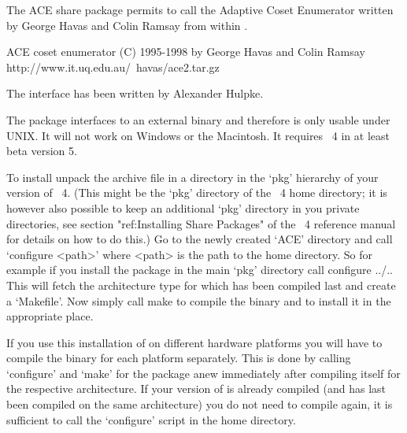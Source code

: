 

The ACE share package permits to call the Adaptive Coset Enumerator written
by George Havas and Colin Ramsay from within {\GAP}. 

\begintt
ACE coset enumerator (C) 1995-1998 by George Havas and Colin Ramsay
    http://www.it.uq.edu.au/~havas/ace2.tar.gz
\endtt

The {\GAP} interface has been written by Alexander Hulpke.

The package interfaces to an external binary and therefore is only usable
under UNIX. It will not work on Windows or the Macintosh. It requires
{\GAP}~4 in at least beta version 5.


To install unpack the archive file in a directory in the `pkg' hierarchy of
your version of {\GAP}~4. (This might be the `pkg' directory of the
{\GAP}~4 home directory; it is however also possible to keep an additional
`pkg' directory in you private directories, see section "ref:Installing
Share Packages" of the {\GAP}~4 reference manual for details on how to do
this.) Go to the newly created `ACE' directory and call `configure <path>'
where <path> is the path to the {\GAP} home directory. So for example if you
install the package in the main `pkg' directory call
\begintt
configure ../..
\endtt
This will fetch the architecture type for which {\GAP} has been compiled last
and create a `Makefile'. 
Now simply call
\begintt
make
\endtt
to compile the binary and to install it in the appropriate place.

If you use this installation of {\GAP} on different hardware platforms you will
have to compile the binary for each platform separately. This is done by
calling `configure' and `make' for the package anew immediately after
compiling {\GAP} itself for the respective architecture.
If your version of {\GAP} is already compiled (and has last been compiled on
the same architecture) you do not need to compile {\GAP}
again, it is sufficient to call the `configure' script in the {\GAP} home
directory.

